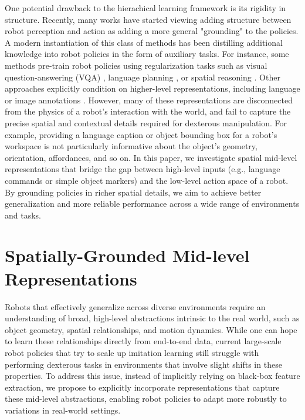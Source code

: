 \documentclass[conference,dvipsnames]{IEEEtran}
\begin{document}
One potential drawback to the hierachical learning framework is its rigidity in structure. Recently, many works have started viewing adding structure between robot perception and action as adding a more general "grounding" to the policies. A modern instantiation of this class of methods has been distilling additional knowledge into robot policies in the form of auxiliary tasks. For instance, some methods pre-train robot policies using regularization tasks such as visual question-answering (VQA) \cite{driess2023palmeembodiedmultimodallanguage, brohan2023rt2visionlanguageactionmodelstransfer, embodimentcollaboration2024openxembodimentroboticlearning, kim2024openvlaopensourcevisionlanguageactionmodel}, language planning \cite{sharma2022skillinductionplanninglatent, liang2023codepolicieslanguagemodel, ha2023scalingdistillingdownlanguageguided}, or spatial reasoning \cite{chen2024spatialvlmendowingvisionlanguagemodels}. Other approaches explicitly condition on higher-level representations, including language \cite{belkhale2024rthactionhierarchiesusing, zawalski2024roboticcontrolembodiedchainofthought} or image annotations \cite{gu2023rttrajectoryrobotictaskgeneralization, niu2024llarvavisionactioninstructiontuning, liu2024mokaopenworldroboticmanipulation}. However, many of these representations are disconnected from the physics of a robot's interaction with the world, and fail to capture the precise spatial and contextual details required for dexterous manipulation. For example, providing a language caption or object bounding box for a robot's workspace is not particularly informative about the object's geometry, orientation, affordances, and so on. In this paper, we investigate spatial mid-level representations that bridge the gap between high-level inputs (e.g., language commands or simple object markers) and the low-level action space of a robot. By grounding policies in richer spatial details, we aim to achieve better generalization and more reliable performance across a wide range of environments and tasks.


\section{Spatially-Grounded Mid-level Representations}
Robots that effectively generalize across diverse environments require an understanding of broad, high-level abstractions intrinsic to the real world, such as object geometry, spatial relationships, and motion dynamics. While one can hope to learn these relationships directly from end-to-end data, current large-scale robot policies that try to scale up imitation learning still struggle with performing dexterous tasks in environments that involve slight shifts in these properties. To address this issue, instead of implicitly relying on black-box feature extraction, we propose to explicitly incorporate representations that capture these mid-level abstractions, enabling robot policies to adapt more robustly to variations in real-world settings.
\end{document}
